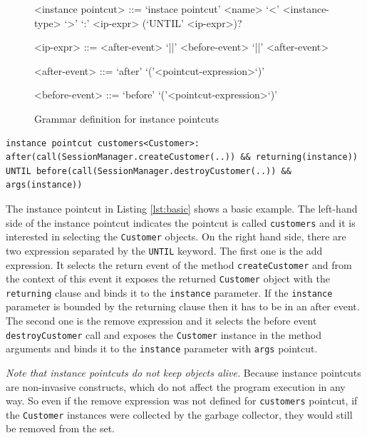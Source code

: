 \documentclass{llncs}
\begin{document}
\begin{figure}[h]
\begin{grammar}
<instance pointcut> ::= `instace pointcut' <name> `<' <instance-type> `>' `:'
<ip-expr> (`UNTIL' <ip-expr>)? 

<ip-expr> ::= <after-event> `||' <before-event>  `||' <after-event>  

<after-event> ::= `after' `('<pointcut-expression>`)'

<before-event> ::= `before' `('<pointcut-expression>`)'
\end{grammar}
\caption{Grammar definition for instance pointcuts}
\label{fig:grammar1}
\end{figure}



\begin{lstlisting}[float=h!, caption={A basic instance pointcut declaration with add and remove expressions}, label={lst:basic}]
instance pointcut customers<Customer>: after(call(SessionManager.createCustomer(..)) && returning(instance)) UNTIL before(call(SessionManager.destroyCustomer(..)) && args(instance))
\end{lstlisting}

The instance pointcut in Listing \ref{lst:basic} shows a basic example. The left-hand side of the instance pointcut indicates the pointcut is called \texttt{customers} and it is interested in selecting the \texttt{Customer} objects. 
On the right hand side, there are two expression separated by the \texttt{UNTIL} keyword. The first one is the add expression. It selects the return event of the method \texttt{createCustomer} and from the context of this event it exposes the returned \texttt{Customer} object with the \texttt{returning} clause and binds it to the \texttt{instance} parameter. If the \texttt{instance} parameter is bounded by the returning clause then it has to be in an after event. The second one is the remove expression and it selects the before event \texttt{destroyCustomer} call and exposes the \texttt{Customer} instance in the method arguments and binds it to the \texttt{instance} parameter with \texttt{args} pointcut.

\emph{Note that instance pointcuts do not keep objects alive.} Because instance pointcuts are non-invasive constructs, which do not affect the program execution in any way. So even if the remove expression was not defined for \texttt{customers} pointcut, if the \texttt{Customer} instances were collected by the garbage collector, they would still be removed from the set. 
\end{document}
